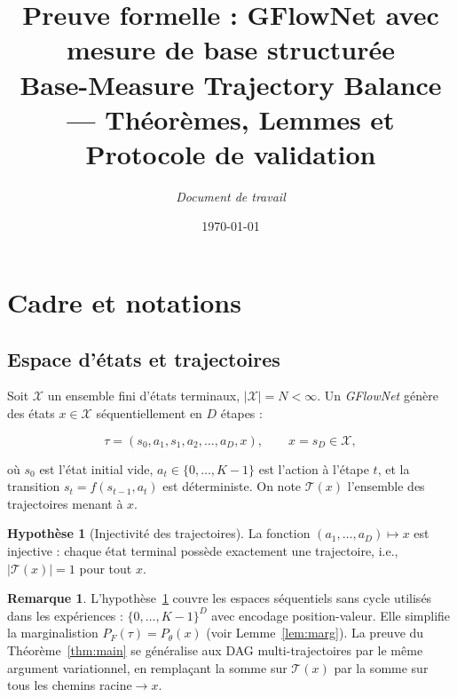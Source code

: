 \documentclass[11pt,a4paper]{article}
\theoremstyle{plain}
\theoremstyle{definition}
\newtheorem{assumption}[theorem]{Hypothèse}
\newtheorem{remark}[theorem]{Remarque}
\theoremstyle{remark}
\newcommand{\calX}{\mathcal{X}}
\newcommand{\calT}{\mathcal{T}}
\newcommand{\pF}{P_F}
\newcommand{\pth}{P_\theta}
\begin{document}
\title{%
  \textbf{Preuve formelle : GFlowNet avec mesure de base structurée}\\[4pt]
  \large Base-Measure Trajectory Balance — Théorèmes, Lemmes et Protocole de validation
}
\author{%
  \textit{Document de travail}
}
\date{\today}
\maketitle
\tableofcontents
\vspace{1em}

\section{Cadre et notations}
\label{sec:setup}

\subsection{Espace d'états et trajectoires}

Soit $\calX$ un ensemble fini d'états terminaux, $|\calX| = N < \infty$.
Un \emph{GFlowNet} génère des états $x \in \calX$ séquentiellement en $D$ étapes :

\begin{equation}
  \tau = (s_0, a_1, s_1, a_2, \ldots, a_D, x),
  \qquad x = s_D \in \calX,
\end{equation}

où $s_0$ est l'état initial vide, $a_t \in \{0,\ldots,K-1\}$ est l'action à l'étape $t$,
et la transition $s_t = f(s_{t-1}, a_t)$ est déterministe.
On note $\calT(x)$ l'ensemble des trajectoires menant à $x$.

\begin{assumption}[Injectivité des trajectoires]
\label{asm:inject}
La fonction $(a_1,\ldots,a_D) \mapsto x$ est injective : chaque état terminal
possède exactement une trajectoire, i.e., $|\calT(x)| = 1$ pour tout $x$.
\end{assumption}

\begin{remark}
L'hypothèse~\ref{asm:inject} couvre les espaces séquentiels sans cycle utilisés
dans les expériences : $\{0,\ldots,K-1\}^D$ avec encodage position-valeur.
Elle simplifie la marginalistion $\pF(\tau) = \pth(x)$ (voir Lemme~\ref{lem:marg}).
La preuve du Théorème~\ref{thm:main} se généralise aux DAG multi-trajectoires
par le même argument variationnel, en remplaçant la somme sur $\calT(x)$ par
la somme sur tous les chemins racine$\to x$.
\end{remark}
\end{document}
